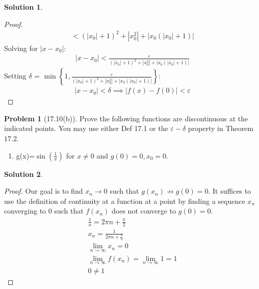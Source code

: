 \documentclass[12pt]{article}
\theoremstyle{definition} %
\newtheorem{solution}{Solution}
\newtheorem{problem}{Problem}
\theoremstyle{plain} %
\begin{document}
\begin{solution}
\begin{enumerate}
\begin{proof}
\begin{align}
        < \left( \left\vert x_0 \right\vert  +1\right)^{2}+\left\vert x_{0}^{2} \right\vert +\left\vert x_0 (\left\vert x_0 \right\vert +1) \right\vert 
      \end{align}
      Solving for $\left\vert x-x_0 \right\vert $:
      \begin{align}
         \left\vert x-x_0 \right\vert < \frac{\varepsilon}{\left( \left\vert x_0 \right\vert  +1\right)^{2}+\left\vert x_{0}^{2} \right\vert +\left\vert x_0 (\left\vert x_0 \right\vert +1) \right\vert}
      \end{align}
      Setting $\delta$ = $\mathop{\min}\left\{ 1, \frac{\varepsilon}{\left( \left\vert x_0 \right\vert  +1\right)^{2}+\left\vert x_{0}^{2} \right\vert +\left\vert x_0 (\left\vert x_0 \right\vert +1) \right\vert}
\right\} $:
\begin{align}
   \left\vert x-x_0 \right\vert <\delta \implies \left\vert f(x)-f(0) \right\vert <\varepsilon
\end{align}
  \end{proof}
   \end{enumerate}
   \end{solution}


\begin{problem}[17.10(b)]
   Prove the following functions are discontinuous at the indicated points. You may use either Def 17.1 or the $\varepsilon-\delta$ property in Theorem $17.2$.
   \begin{enumerate}
    \item g(x)=$\sin \left( \frac{1}{x} \right) $ for $x\neq 0$ and $g(0)=0,x_{0}=0  $.
   \end{enumerate}   
\end{problem}
\begin{solution} 
   \begin{proof}
     Our goal is to find $x_{n}\to 0$ such that $g(x_{n})\not\to g(0)=0$. It suffices to use the definition of continuity at a function at a point by finding a sequence $x_{n}$ converging to $0$ such that $f(x_{n})$ does not converge to $g(0)=0$. 
    \begin{align}
      \frac{1}{x}=2\pi n+\frac{\pi}{2}\\[10pt] 
      x_{n}=\frac{1}{2\pi n+\frac{\pi}{2}} \\[10pt] 
      \lim_{n \to \infty} x_{n}=0 \\[10pt] 
      \lim_{n \to \infty} f(x_{n})=\lim_{n \to \infty} 1 = 1 \\[10pt] 
      0 \neq 1
    \end{align}
    
   \end{proof}
    \end{solution}
\end{document}
